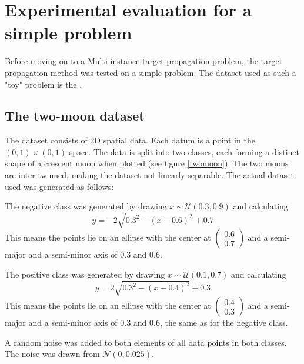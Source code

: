 \chapter{Experimental evaluation for a simple problem}

Before moving on to a Multi-instance target propagation problem, the target propagation method was tested on a simple problem. The dataset used as such a "toy" problem is the .

\section{The two-moon dataset}
The dataset consists of 2D spatial data. Each datum is a point in the \( \left( 0, 1 \right) \times \left( 0, 1 \right) \) space. The data is split into two classes, each forming a distinct shape of a crescent moon when plotted (see figure \ref{twomoon}). The two moons are inter-twinned, making the dataset not linearly separable. The actual dataset used was generated as follows:

The negative class was generated by drawing \( x \sim \mathcal{U} \left( 0.3, 0.9 \right) \) and calculating
\[ y = -2 \sqrt{0.3^2 - \left( x - 0.6 \right)^2} + 0.7 \]
This means the points lie on an ellipse with the center at \( \begin{pmatrix} 0.6 \\ 0.7 \end{pmatrix} \) and a semi-major and a semi-minor axis of \( 0.3 \) and \( 0.6 \).

The positive class was generated by drawing \( x \sim \mathcal{U} \left( 0.1, 0.7 \right) \) and calculating
\[ y = 2 \sqrt{0.3^2 - \left( x - 0.4 \right)^2} + 0.3 \]
This means the points lie on an ellipse with the center at \( \begin{pmatrix} 0.4 \\ 0.3 \end{pmatrix} \) and a semi-major and a semi-minor axis of \( 0.3 \) and \( 0.6 \), the same as for the negative class.

A random noise was added to both elements of all data points in both classes. The noise was drawn from \( \mathcal{N} \left(0, 0.025 \right) \).


